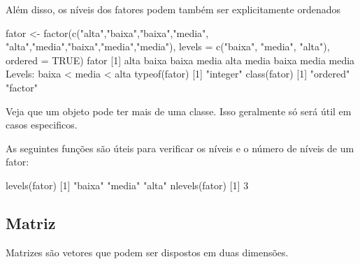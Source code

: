 \documentclass[
  10pt,
  a4paper]{book}
\newenvironment{Shaded}{\begin{snugshade}}{\end{snugshade}}
\newcommand{\AttributeTok}[1]{\textcolor[rgb]{0.77,0.63,0.00}{#1}}
\newcommand{\ConstantTok}[1]{\textcolor[rgb]{0.00,0.00,0.00}{#1}}
\newcommand{\DecValTok}[1]{\textcolor[rgb]{0.00,0.00,0.81}{#1}}
\newcommand{\FunctionTok}[1]{\textcolor[rgb]{0.00,0.00,0.00}{#1}}
\newcommand{\NormalTok}[1]{#1}
\newcommand{\OtherTok}[1]{\textcolor[rgb]{0.56,0.35,0.01}{#1}}
\newcommand{\SpecialCharTok}[1]{\textcolor[rgb]{0.00,0.00,0.00}{#1}}
\newcommand{\StringTok}[1]{\textcolor[rgb]{0.31,0.60,0.02}{#1}}
\begin{document}
Além disso, os níveis dos fatores podem também ser explicitamente
ordenados

\begin{Shaded}
\begin{Highlighting}[]
\NormalTok{fator }\OtherTok{\textless{}{-}} \FunctionTok{factor}\NormalTok{(}\FunctionTok{c}\NormalTok{(}\StringTok{"alta"}\NormalTok{,}\StringTok{"baixa"}\NormalTok{,}\StringTok{"baixa"}\NormalTok{,}\StringTok{"media"}\NormalTok{,}
                  \StringTok{"alta"}\NormalTok{,}\StringTok{"media"}\NormalTok{,}\StringTok{"baixa"}\NormalTok{,}\StringTok{"media"}\NormalTok{,}\StringTok{"media"}\NormalTok{),}
                \AttributeTok{levels =} \FunctionTok{c}\NormalTok{(}\StringTok{"baixa"}\NormalTok{, }\StringTok{"media"}\NormalTok{, }\StringTok{"alta"}\NormalTok{),}
                \AttributeTok{ordered =} \ConstantTok{TRUE}\NormalTok{)}
\NormalTok{fator}
\NormalTok{[}\DecValTok{1}\NormalTok{] alta  baixa baixa media alta  media baixa media media}
\NormalTok{Levels}\SpecialCharTok{:}\NormalTok{ baixa }\SpecialCharTok{\textless{}}\NormalTok{ media }\SpecialCharTok{\textless{}}\NormalTok{ alta}
\FunctionTok{typeof}\NormalTok{(fator)}
\NormalTok{[}\DecValTok{1}\NormalTok{] }\StringTok{"integer"}
\FunctionTok{class}\NormalTok{(fator)}
\NormalTok{[}\DecValTok{1}\NormalTok{] }\StringTok{"ordered"} \StringTok{"factor"} 
\end{Highlighting}
\end{Shaded}

Veja que um objeto pode ter mais de uma classe. Isso geralmente só
será útil em casos especificos.

As seguintes funções são úteis para verificar os níveis e o número de
níveis de um fator:

\begin{Shaded}
\begin{Highlighting}[]
\FunctionTok{levels}\NormalTok{(fator)}
\NormalTok{[}\DecValTok{1}\NormalTok{] }\StringTok{"baixa"} \StringTok{"media"} \StringTok{"alta"} 
\FunctionTok{nlevels}\NormalTok{(fator)}
\NormalTok{[}\DecValTok{1}\NormalTok{] }\DecValTok{3}
\end{Highlighting}
\end{Shaded}

\hypertarget{matriz}{%
\subsection{Matriz}\label{matriz}}

Matrizes são vetores que podem ser dispostos em duas dimensões.
\end{document}
